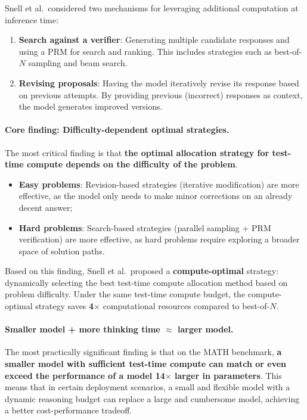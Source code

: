 Snell et al.\ considered two mechanisms for leveraging additional computation at inference time:
\begin{enumerate}[leftmargin=2em]
  \item \textbf{Search against a verifier}:
    Generating multiple candidate responses and using a PRM for search and ranking.
    This includes strategies such as best-of-$N$ sampling and beam search.

  \item \textbf{Revising proposals}:
    Having the model iteratively revise its response based on previous attempts.
    By providing previous (incorrect) responses as context,
    the model generates improved versions.
\end{enumerate}

\paragraph{Core finding: Difficulty-dependent optimal strategies.}
The most critical finding is that \textbf{the optimal allocation strategy for test-time compute depends on the difficulty of the problem}.
\begin{itemize}[leftmargin=2em]
  \item \textbf{Easy problems}:
    Revision-based strategies (iterative modification) are more effective,
    as the model only needs to make minor corrections on an already decent answer;
  \item \textbf{Hard problems}:
    Search-based strategies (parallel sampling + PRM verification) are more effective,
    as hard problems require exploring a broader space of solution paths.
\end{itemize}

\noindent
Based on this finding, Snell et al.\ proposed a \textbf{compute-optimal} strategy:
dynamically selecting the best test-time compute allocation method based on problem difficulty.
Under the same test-time compute budget,
the compute-optimal strategy saves \textbf{4$\times$} computational resources compared to best-of-$N$.

\paragraph{Smaller model + more thinking time $\approx$ larger model.}
The most practically significant finding is that
on the MATH benchmark,
\textbf{a smaller model with sufficient test-time compute
can match or even exceed the performance of a model 14$\times$ larger in parameters}.
This means that in certain deployment scenarios,
a small and flexible model with a dynamic reasoning budget can replace a large and cumbersome model,
achieving a better cost-performance tradeoff.

